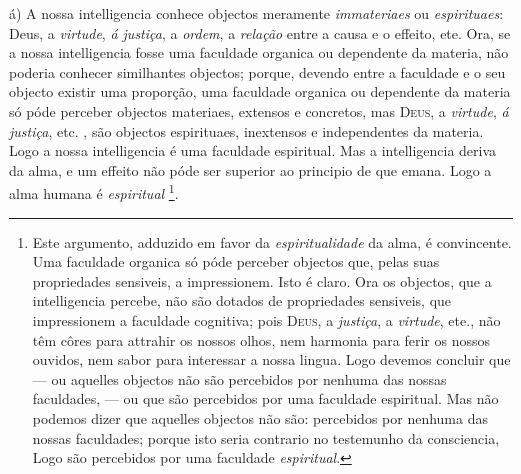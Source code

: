 á) A nossa intelligencia conhece objectos meramente \emph{immateriaes} ou \emph{espirituaes}: Deus, a \emph{virtude}, \emph{á justiça}, a \emph{ordem}, a \emph{relação} entre a causa e o effeito, ete. Ora, se a nossa intelligencia fosse uma faculdade organica ou dependente da materia, não poderia conhecer similhantes objectos; porque, devendo entre a faculdade e o seu objecto existir uma proporção, uma faculdade organica ou dependente da materia só   póde perceber objectos materiaes, extensos e concretos, mas \textsc{Deus}, a \emph{virtude}, \emph{á justiça}, etc. , são objectos espirituaes, inextensos e independentes da materia. Logo a nossa intelligencia é uma faculdade espiritual. Mas a intelligencia deriva da alma, e um effeito não póde ser superior ao principio de que emana. Logo a alma humana é \emph{espiritual} \footnote{Este argumento, adduzido em favor da \emph{espiritualidade} da alma, é convincente. Uma faculdade organica só póde perceber objectos que, pelas suas propriedades sensiveis, a impressionem. Isto é claro. Ora os objectos, que a intelligencia percebe, não são dotados de propriedades sensiveis, que impressionem a faculdade cognitiva; pois \textsc{Deus}, a \emph{justiça}, a \emph{virtude}, ete., não têm côres para attrahir os nossos olhos, nem harmonia para ferir os nossos ouvidos, nem sabor para interessar a nossa lingua. Logo devemos concluir que --- ou aquelles objectos não são percebidos por nenhuma das nossas faculdades, --- ou que são percebidos por uma faculdade espiritual. Mas não podemos dizer que aquelles objectos não são: percebidos por nenhuma das nossas faculdades; porque isto seria contrario no testemunho da consciencia, Logo são percebidos por uma faculdade \emph{espiritual}.}.

